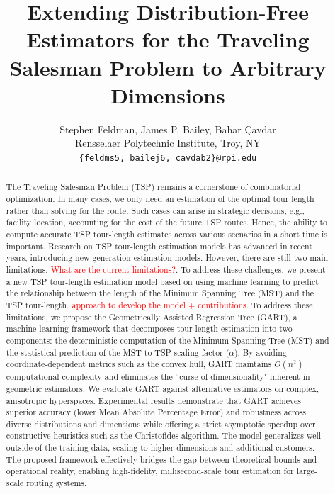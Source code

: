 \documentclass{article}
\title{Extending Distribution-Free Estimators for the Traveling Salesman Problem to Arbitrary Dimensions 
}
\author{
  Stephen Feldman, James P. Bailey, Bahar \c{C}avdar \\
  Rensselaer Polytechnic Institute, Troy, NY\\
  \texttt{\{feldms5, bailej6, cavdab2\}@rpi.edu} \\
}
\begin{document}
\maketitle


\begin{abstract}
The Traveling Salesman Problem (TSP) remains a cornerstone of combinatorial optimization.
In many cases, we only need an estimation of the optimal tour length rather than solving for the route. 
Such cases can arise in strategic decisions, e.g., facility location, accounting for the cost of the future TSP routes. 
Hence, the ability to compute accurate TSP tour-length estimates across various scenarios in a short time is important.
Research on TSP tour-length estimation models has advanced in recent years, introducing new generation estimation models.
However, there are still two main limitations. 
\textcolor{red}{What are the current limitations?}.
To address these challenges, we present a new TSP tour-length estimation model based on using machine learning to predict the relationship between the length of the Minimum Spanning Tree (MST)  and the TSP tour-length. 
\textcolor{red}{approach to develop the model + contributions}.
To address these limitations, we propose the Geometrically Assisted Regression Tree (GART), a machine learning framework that decomposes tour-length estimation into two components: the deterministic computation of the Minimum Spanning Tree (MST) and the statistical prediction of the MST-to-TSP scaling factor ($\alpha$).
By avoiding coordinate-dependent metrics such as the convex hull, GART maintains $O(n^2)$ computational complexity and eliminates the ``curse of dimensionality" inherent in geometric estimators. We evaluate GART against alternative estimators on complex, anisotropic hyperspaces. Experimental results demonstrate that GART achieves superior accuracy (lower Mean Absolute Percentage Error) and robustness across diverse distributions and dimensions %
while offering a strict asymptotic speedup over constructive heuristics such as the Christofides algorithm. The model generalizes well outside of the training data, scaling to higher dimensions and additional customers. The proposed framework effectively bridges the gap between theoretical bounds and operational reality, enabling high-fidelity, millisecond-scale tour estimation for large-scale routing systems.


\end{abstract}
\end{document}
